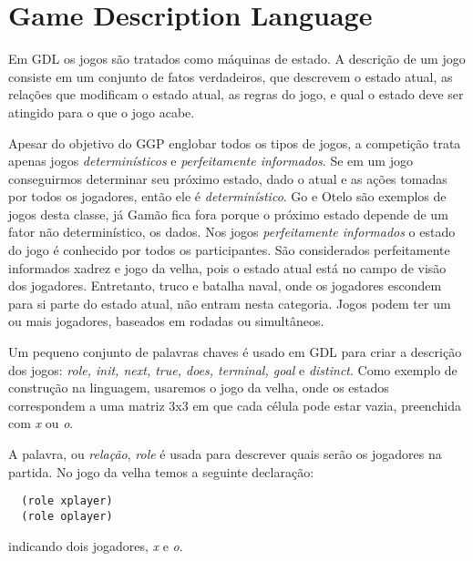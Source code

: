 \section{Game Description Language}
Em GDL os jogos são tratados como máquinas de estado. A descrição de um jogo
consiste em um conjunto de fatos verdadeiros, que descrevem o estado atual, as
relações que modificam o estado atual, as regras do jogo, e qual o estado deve
ser atingido para o que o jogo acabe.
 
Apesar do objetivo do GGP englobar todos os tipos de jogos, a competição trata
apenas jogos {\it determinísticos} e {\it perfeitamente informados}. Se em um
jogo conseguirmos determinar seu próximo estado, dado o atual e as ações tomadas
por todos os jogadores, então ele é {\it determinístico}. Go e Otelo são
exemplos de jogos desta classe, já Gamão fica fora porque o próximo estado
depende de um fator não determinístico, os dados. Nos jogos {\it perfeitamente
  informados}
o estado do jogo é conhecido por todos os participantes. São
considerados perfeitamente informados xadrez e jogo da velha, pois o estado
atual está no campo de visão dos jogadores. Entretanto, truco e batalha naval,
onde os jogadores escondem para si parte do estado atual, não entram nesta
categoria. Jogos podem ter um ou mais jogadores, baseados em rodadas ou
simultâneos.
 
Um pequeno conjunto de palavras chaves é usado em GDL para criar a descrição dos
jogos: {\it role, init, next, true, does, terminal, goal} e {\it distinct}.
Como exemplo de construção na linguagem, usaremos o jogo da velha, onde os
estados correspondem a uma matriz 3x3 em que cada célula pode estar vazia,
preenchida com {\it x} ou {\it o}.
 
A palavra, ou {\it relação}, {\it role} é usada para descrever quais serão os
jogadores na partida. No jogo da velha temos a seguinte declaração:
\begin{verbatim}
  (role xplayer)
  (role oplayer)
\end{verbatim}
indicando dois jogadores, {\it x} e {\it o}.
 
